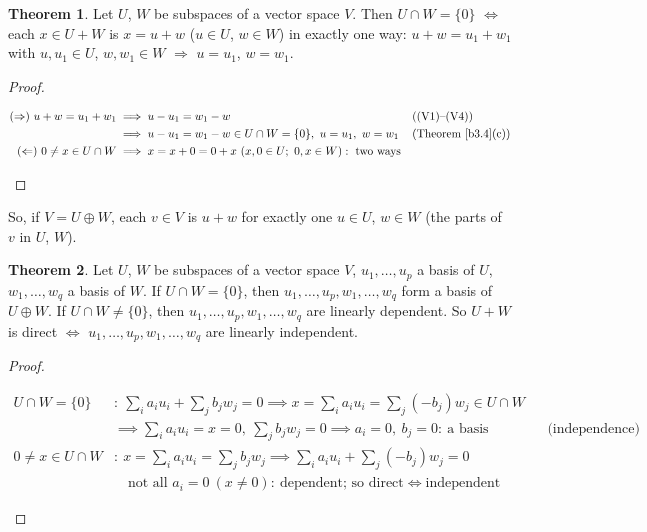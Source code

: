 \documentclass[12pt]{article}
\theoremstyle{definition}
\newtheorem{theorem}{Theorem}
\newcommand{\boardtop}{\vspace*{-\abovedisplayskip}}
\begin{document}
\begin{theorem}\label{b3.32}
Let \(U\), \(W\) be subspaces of a vector space \(V\). Then \(U\cap W=\{0\}\) \(\iff\) each \(x\in U+W\) is \(x=u+w\)
(\(u\in U\), \(w\in W\)) in exactly one way: \(u+w=u_1+w_1\) with \(u,u_1\in U\), \(w,w_1\in W\) \(\Rightarrow\)
\(u=u_1\), \(w=w_1\).
\end{theorem}
\begin{proof}
\begin{board}[\((\Rightarrow)\) with \(U\cap W=\{0\}\); \((\Leftarrow)\) by contraposition:]
\boardtop
\begin{align*}
(\Rightarrow)\ u+w=u_1+w_1&\implies u-u_1=w_1-w&&\text{((V1)--(V4))}\\
&\implies u-u_1=w_1-w\in U\cap W=\{0\},\ u=u_1,\ w=w_1&&\text{(Theorem~\ref{b3.4}(c))}\\
(\Leftarrow)\ 0\ne x\in U\cap W&\implies x=x+0=0+x\ (x,0\in U;\ 0,x\in W):\ \text{two ways}
\end{align*}
\end{board}
\nopagebreak
\end{proof}
So, if \(V=U\oplus W\), each \(v\in V\) is \(u+w\) for exactly one \(u\in U\), \(w\in W\) (the parts of \(v\) in
\(U\), \(W\)).

\begin{theorem}\label{b3.33}
Let \(U\), \(W\) be subspaces of a vector space \(V\), \(u_1,\dots,u_p\) a basis of \(U\), \(w_1,\dots,w_q\) a basis of
\(W\). If \(U\cap W=\{0\}\), then \(u_1,\dots,u_p,w_1,\dots,w_q\) form a basis of \(U\oplus W\). If \(U\cap W\ne\{0\}\),
then \(u_1,\dots,u_p,w_1,\dots,w_q\) are linearly dependent. So \(U+W\) is direct \(\iff\)
\(u_1,\dots,u_p,w_1,\dots,w_q\) are linearly independent.
\end{theorem}
\begin{proof}
\begin{board}
\boardtop
\begin{align*}
U\cap W=\{0\}&:\ \textstyle\sum_ia_iu_i+\sum_jb_jw_j=0\implies x=\textstyle\sum_ia_iu_i=\sum_j(-b_j)w_j\in U\cap W\\
&\implies\textstyle\sum_ia_iu_i=x=0,\ \sum_jb_jw_j=0\implies a_i=0,\ b_j=0:\ \text{a basis}&&\text{(independence)}\\
0\ne x\in U\cap W&:\ x=\textstyle\sum_ia_iu_i=\sum_jb_jw_j\implies\textstyle\sum_ia_iu_i+\sum_j(-b_j)w_j=0\\
&\quad\text{not all }a_i=0\ (x\ne0):\ \text{dependent; so direct}\iff\text{independent}
\end{align*}
\end{board}
\nopagebreak
\end{proof}
\end{document}
